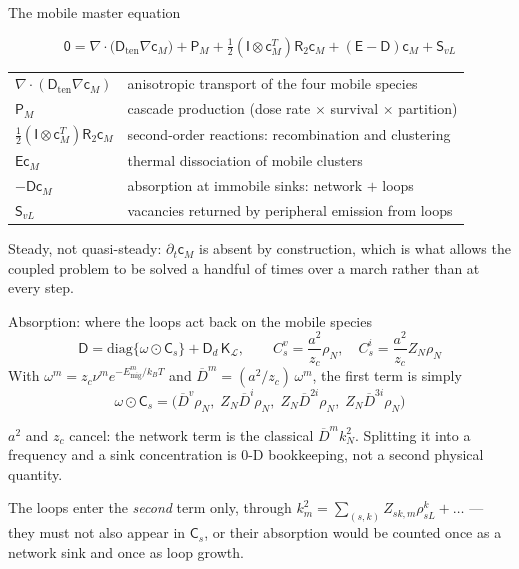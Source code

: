 \documentclass[aspectratio=169,10pt]{beamer}
\newcommand{\spvec}[1]{\bm{\mathsf{#1}}}
\newcommand{\spmat}[1]{\bm{\mathsf{#1}}}
\newcommand{\foot}[1]{\par\vspace{1ex}%
  \begingroup\footnotesize\raggedright #1\par\endgroup}
\begin{document}
\begin{frame}{The mobile master equation}
\begin{block}{}
\[
  \spvec 0 = \nabla\!\cdot\!\bigl(\spmat D_{\mathrm{ten}}\nabla\spvec c_M\bigr)
    + \spvec P_M
    + \tfrac12(\spmat I\otimes\spvec c_M^{T})\spmat R_2\spvec c_M
    + (\spmat E-\spmat D)\spvec c_M + \spvec S_{vL}
\]
\end{block}
\vspace{-1ex}
\begin{center}\small
\begin{tabular}{@{}ll@{}}
\toprule
$\nabla\!\cdot\!(\spmat D_{\mathrm{ten}}\nabla\spvec c_M)$ & anisotropic transport of the four mobile species \\
$\spvec P_M$ & cascade production (dose rate $\times$ survival $\times$ partition) \\
$\tfrac12(\spmat I\otimes\spvec c_M^{T})\spmat R_2\spvec c_M$ & second-order reactions: recombination and clustering \\
$\spmat E\spvec c_M$ & thermal dissociation of mobile clusters \\
$-\spmat D\spvec c_M$ & absorption at immobile sinks: network $+$ loops \\
$\spvec S_{vL}$ & vacancies returned by peripheral emission from loops \\
\bottomrule
\end{tabular}
\end{center}
\foot{Steady, not quasi-steady: $\partial_t\spvec c_M$ is absent by
construction, which is what allows the coupled problem to be solved a handful
of times over a march rather than at every step.}
\end{frame}

\begin{frame}{Absorption: where the loops act back on the mobile species}
\[
  \spmat D = \mathrm{diag}\{\spvec\omega\odot\spvec C_s\}
             + \spmat D_d\,\spmat K_{\mathcal L},
  \qquad
  C_s^{v}=\frac{a^2}{z_c}\rho_N,\quad C_s^{i}=\frac{a^2}{z_c}Z_N\rho_N
\]
With $\omega^{m}=z_c\nu^{m}e^{-E^{m}_{\mathrm{mig}}/k_BT}$ and
$\overline D^{m}=(a^{2}/z_c)\,\omega^{m}$, the first term is simply
\[
  \spvec\omega\odot\spvec C_s
  =\bigl(\overline D^{v}\rho_N,\;Z_N\overline D^{i}\rho_N,\;
         Z_N\overline D^{2i}\rho_N,\;Z_N\overline D^{3i}\rho_N\bigr)
\]
\vspace{-1ex}
\begin{block}{}\small
$a^2$ and $z_c$ cancel: the network term is the classical
$\overline D^{m}k^{2}_N$. Splitting it into a frequency and a sink
concentration is 0-D bookkeeping, not a second physical quantity.
\end{block}
\foot{The loops enter the \emph{second} term only, through
$k_m^{2}=\sum_{(s,k)}Z_{sk,m}\rho^{k}_{sL}+\dots$ --- they must not also appear
in $\spvec C_s$, or their absorption would be counted once as a network sink
and once as loop growth.}
\end{frame}
\end{document}
